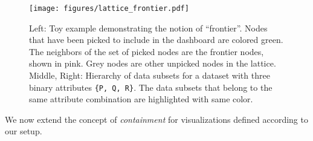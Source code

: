 \begin{figure}[ht!]
\texttt{[image: figures/lattice\_frontier.pdf]}
\caption{Left: Toy example demonstrating the notion of ``frontier''. Nodes that have been picked to include in the dashboard are colored green. The neighbors of the set of picked nodes are the frontier nodes, shown in pink. Grey nodes are other unpicked nodes in the lattice. Middle, Right: Hierarchy of data subsets for a dataset with three binary attributes {\tt \{P, Q, R\}}. The data subsets that belong to the same attribute combination are highlighted with same color.}
\label{fig:lattice}
\end{figure}
We now extend the concept of \emph{containment} for visualizations defined according to our setup.





